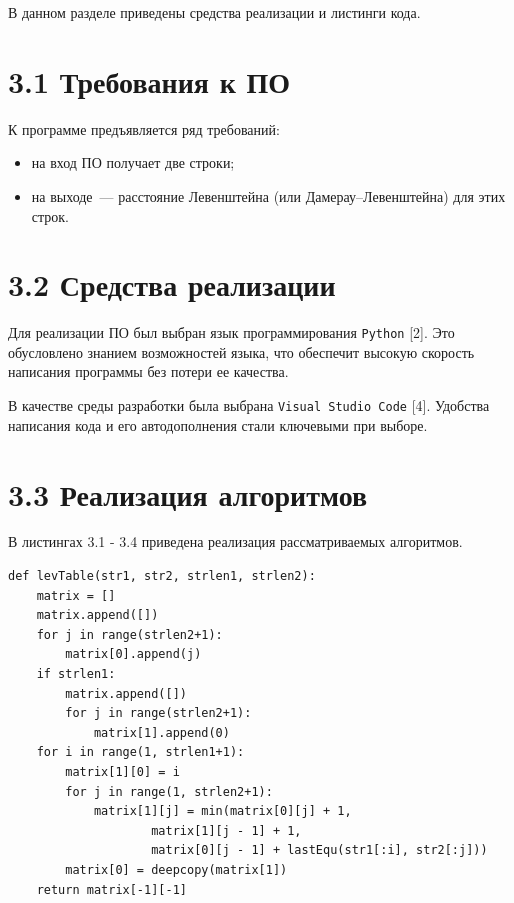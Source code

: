 \documentclass[12pt, a4paper]{report}
\begin{document}
В данном разделе приведены средства реализации и листинги кода.

\section*{3.1 Требования к ПО}

К программе предъявляется ряд требований:

\begin{itemize}
	\item на вход ПО получает две строки;
	\item на выходе~--- расстояние Левенштейна (или Дамерау--Левенштейна) для этих строк.
\end{itemize}

\section*{3.2 Средства реализации}

Для реализации ПО был выбран язык программирования \verb|Python| [2]. Это обусловлено знанием возможностей языка, что обеспечит высокую скорость написания программы без потери ее качества. 

В качестве среды разработки была выбрана \verb|Visual Studio Code| [4]. Удобства написания кода и его автодополнения стали ключевыми при выборе.

\section*{3.3 Реализация алгоритмов}

В листингах 3.1 - 3.4 приведена реализация рассматриваемых алгоритмов.

\newpage
\begin{lstlisting}[title=Листинг 3.1~--- Расстояние Левенштейна с двухстрочным кэшем]
def levTable(str1, str2, strlen1, strlen2):
	matrix = []
	matrix.append([])
	for j in range(strlen2+1):
		matrix[0].append(j)
	if strlen1:
		matrix.append([])
		for j in range(strlen2+1):
			matrix[1].append(0)
	for i in range(1, strlen1+1):
		matrix[1][0] = i
		for j in range(1, strlen2+1):
			matrix[1][j] = min(matrix[0][j] + 1,
					matrix[1][j - 1] + 1,
					matrix[0][j - 1] + lastEqu(str1[:i], str2[:j]))
		matrix[0] = deepcopy(matrix[1])
	return matrix[-1][-1]
\end{lstlisting}
\end{document}
